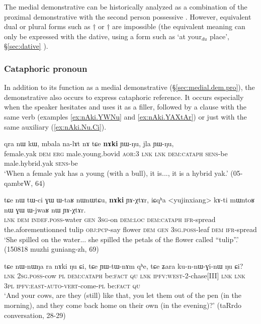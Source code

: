 The medial demonstrative  can be historically analyzed as a combination of the proximal demonstrative  with the second person possessive . However, equivalent dual or plural forms such as  $\dagger$ or $\dagger$ are impossible (the equivalent meaning can only be expressed with the dative, using a form such as  `at your$_{du}$ place', §\ref{sec:dative} ).


\subsubsection{Cataphoric pronoun}
\label{sec:cataph.pron}
In addition to its function as a medial demonstrative (§\ref{sec:medial.dem.pro}), the demonstrative  also occurs to express cataphoric reference. It occurs especially when the speaker hesitates and uses it as a filler, followed by a clause with the same verb (examples \ref{ex:nAki.YWNu} and \ref{ex:nAki.YAXtAr}) or just with the same auxiliary (\ref{ex:nAki.Nu.Ci}).

\begin{exe}
\ex \label{ex:nAki.YWNu}
 \gll qra nɯ kɯ, mbala na-lɤt nɤ tɕe \textbf{nɤki} ɲɯ-ŋu, jla ɲɯ-ŋu, \\
female.yak \textsc{dem} \textsc{erg} male.young.bovid \textsc{aor}:3\flobv{} \textsc{lnk} \textsc{lnk} \textsc{dem}:\textsc{cataph} \textsc{sens}-be male.hybrid.yak \textsc{sens}-be \\
\glt `When a female yak has a young (with a bull), it is..., it is a hybrid yak.' (05-qambrW, 64)
\end{exe}

\begin{exe}
\ex \label{ex:nAki.YAXtAr}
 \gll tɕe nɯ tɯ-ci ɣɯ ɯ-taʁ nɯnɯtɕu, \textbf{nɤki} ɲɤ-χtɤr, iɕqʰa <yujinxiang> kɤ-ti mɯntoʁ nɯ ɣɯ  ɯ-jwaʁ nɯ ɲɤ-χtɤr.  \\
\textsc{lnk} \textsc{dem} \textsc{indef}.\textsc{poss}-water \textsc{gen} \textsc{3sg}-on \textsc{dem}:\textsc{loc} \textsc{dem}:\textsc{cataph} \textsc{ifr}-spread the.aforementionned tulip \textsc{obj}:\textsc{pcp}-say flower \textsc{dem} \textsc{gen} \textsc{3sg}.\textsc{poss}-leaf \textsc{dem} \textsc{ifr}-spread \\
\glt `She spilled on the water...  she spilled the petals of the flower called ``tulip''.' (150818 muzhi guniang-zh, 69)
\end{exe}

\begin{exe}
\ex \label{ex:nAki.Nu.Ci}
 \gll tɕe nɯ-nɯŋa ra nɤki ŋu ɕi, tɕe ɲɯ-tɯ-nɤm qʰe, tɕe ʑara ku-n-nɯ-ɣi-nɯ ŋu ɕi? \\
\textsc{lnk} \textsc{2sg}.\textsc{poss}-cow \textsc{pl} \textsc{dem}:\textsc{cataph} be:\textsc{fact} \textsc{qu} \textsc{lnk} \textsc{ipfv}:\textsc{west}-2-chase[III] \textsc{lnk} \textsc{lnk} \textsc{3pl} \textsc{ipfv}:\textsc{east}-\textsc{auto}-\textsc{vert}-come-\textsc{pl} be:\textsc{fact} \textsc{qu} \\
\glt `And your cows, are they (still) like that, you let them out of the pen (in the morning), and  they come back home on their own (in the evening)?' (taRrdo conversation, 28-29)
\end{exe}

